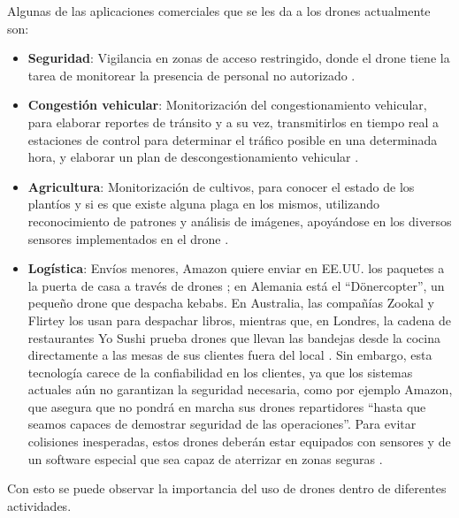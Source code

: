 Algunas de las aplicaciones comerciales que se les da a los drones actualmente 
son:

\begin{itemize}
	\item \textbf{Seguridad}: Vigilancia en zonas de acceso restringido, 
donde el drone tiene la tarea de monitorear la presencia de personal no 
autorizado \cite{morelos_cinco_for_security, drones_empresas_sec_vigi}.
	\item \textbf{Congestión vehicular}: Monitorización del 
congestionamiento vehicular, para elaborar reportes de tránsito y a su vez, 
transmitirlos en tiempo real a estaciones de control para determinar el tráfico 
posible en una determinada hora, y elaborar un plan de descongestionamiento 
vehicular \cite{african_drones_johanesburg_cong}.
	\item \textbf{Agricultura}: Monitorización de cultivos, para conocer el 
estado de los plantíos y si es que existe alguna plaga en los mismos, utilizando 
reconocimiento de patrones y análisis de imágenes, apoyándose en los diversos 
sensores implementados en el drone \cite{drones_for_agricultura}.
	\item \textbf{Logística}: Envíos menores, Amazon quiere enviar en 
EE.UU. los paquetes a la puerta de casa a través de drones 
\cite{amazon_prime_air}; en Alemania 
está el “Dönercopter”, un pequeño drone que despacha kebabs. En Australia, las 
compañías Zookal y Flirtey los usan para despachar libros, mientras que, en 
Londres, la cadena de restaurantes Yo Sushi prueba drones que llevan las 
bandejas desde la cocina directamente a las mesas de sus clientes fuera del 
local \cite{amazon_prime_air}. Sin embargo, esta tecnología carece de la 
confiabilidad en los clientes, ya que los sistemas actuales aún no garantizan la 
seguridad necesaria, como por ejemplo Amazon, que asegura que no pondrá en 
marcha sus drones repartidores “hasta que seamos capaces de demostrar seguridad 
de las operaciones”. Para evitar colisiones inesperadas, estos drones deberán 
estar equipados con sensores y de un software especial que sea capaz de 
aterrizar en zonas seguras \cite{func_amazon_prime_air}.
\end{itemize}

Con esto se puede observar la importancia del uso de drones dentro de diferentes actividades.